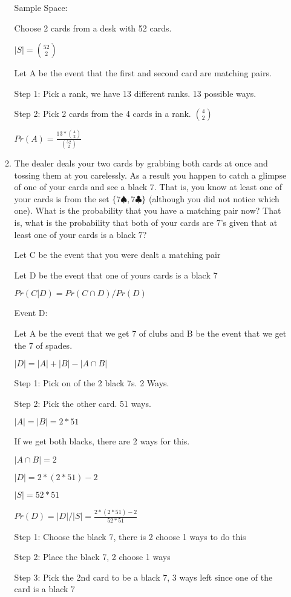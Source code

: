 \documentclass[12pt]{article}
\newcounter{ques}
\newenvironment{question}{\stepcounter{ques}{\noindent\bf Question \arabic{ques}:}}{\vspace{5mm}}
\begin{document}
\begin{question}
\begin{enumerate}
\begin{enumerate}
			Sample Space:

			Choose 2 cards from a desk with 52 cards.

			$|S| = {52 \choose 2}$

			Let A be the event that the first and second card are matching pairs.

			Step 1: Pick a rank, we have 13 different ranks. 13 possible ways.

			Step 2: Pick 2 cards from the 4 cards in a rank. ${4 \choose 2}$

			$Pr(A) = \frac{13* {4 \choose 2}}{{52 \choose 2}}$

 			\item The dealer deals your two cards by grabbing both cards at once and tossing them at you carelessly. As a result you happen to catch a glimpse of one of your cards and see a black $7$. That is, you know at least one of your cards is from the set $\{7\spadesuit, 7\clubsuit\}$ (although you did not notice which one). What is the probability that you have a matching pair now? That is, what is the probability that both of your cards are $7$'s given that at least one of your cards is a black $7$?

			Let C be the event that you were dealt a matching pair

			Let D be the event that one of yours cards is a black 7

			$Pr(C|D) = Pr(C \cap D)/Pr(D)$

			Event D:

			Let A be the event that we get 7 of clubs and B be the event that we get the 7 of spades.
			
			$|D| = |A| + |B| - |A \cap B|$

			Step 1: Pick on of the 2 black 7s. 2 Ways.

			Step 2: Pick the other card. 51 ways.

			$|A| = |B| = 2 * 51$

			If we get both blacks, there are 2 ways for this.

			$|A \cap B| = 2$

			$|D| = 2*(2 * 51) - 2$

			$|S| = 52 * 51$

			$Pr(D) = |D| / |S| = \frac{2*(2 * 51) - 2}{52*51}$

			Step 1: Choose the black 7, there is 2 choose 1 ways to do this

			Step 2: Place the black 7, 2 choose 1 ways

			Step 3: Pick the 2nd card to be a black 7, 3 ways left since one of the card is a black 7


\end{enumerate}
\end{enumerate}
\end{question}
\end{document}
